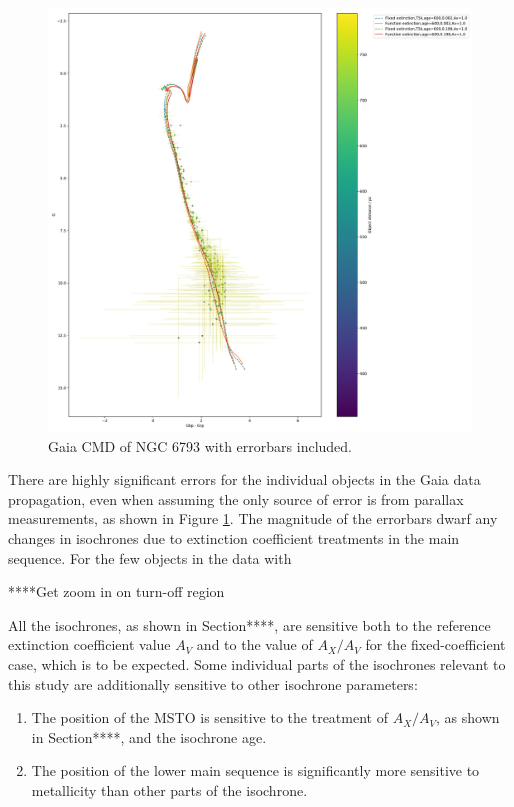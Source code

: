 \documentclass[12pt, a4paper]{report}
\begin{document}
\begin{figure}[h]
\begin{center}
\includegraphics[scale=0.3]{../NGC_6793_CMD_FeH_0p002_0p198_Av_1p0_600Myr_isochrones_both_errorbars_T5k.pdf}
\caption{Gaia CMD of NGC 6793 with errorbars included.}
\label{ngc_errorbars}
\end{center}
\end{figure}

There are highly significant errors for the individual objects in the Gaia data propagation, even when assuming the only source of error is from  parallax measurements, as shown in Figure \ref{ngc_errorbars}. The magnitude of the errorbars dwarf any changes in isochrones due to extinction coefficient treatments in the main sequence. For the few objects in the data with 

****Get zoom in on turn-off region

All the isochrones, as shown in Section****, are sensitive both to the reference extinction coefficient value $A_{V}$ and to the value of $A_{X}/A_{V}$ for the fixed-coefficient case, which is to be expected. Some individual parts of the isochrones relevant to this study are additionally sensitive to other isochrone parameters:

\begin{enumerate}
\item The position of the MSTO is sensitive to the treatment of $A_{X}/A_{V}$, as shown in Section****, and the isochrone age.
\item The position of the lower main sequence is significantly more sensitive to metallicity than other parts of the isochrone.
\end{enumerate}
\end{document}
